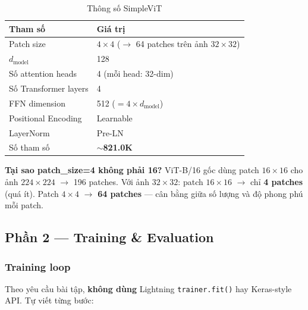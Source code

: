 \documentclass[12pt, a4paper]{article}
\begin{document}
\begin{table}[H]
\centering
\caption{Thông số SimpleViT}
\begin{tabular}{ll}
\toprule
\textbf{Tham số} & \textbf{Giá trị} \\
\midrule
Patch size          & $4\times4$ ($\rightarrow$ 64 patches trên ảnh $32\times32$) \\
$d_\text{model}$    & 128 \\
Số attention heads  & 4 (mỗi head: 32-dim) \\
Số Transformer layers & 4 \\
FFN dimension       & 512 ($= 4 \times d_\text{model}$) \\
Positional Encoding & Learnable \\
LayerNorm           & Pre-LN \\
Số tham số          & $\sim$\textbf{821.0K} \\
\bottomrule
\end{tabular}
\end{table}

\begin{myquote}
\textbf{Tại sao patch\_size=4 không phải 16?} ViT-B/16 gốc dùng patch $16\times16$ cho ảnh $224\times224$ $\rightarrow$ 196 patches. Với ảnh $32\times32$: patch $16\times16$ $\rightarrow$ chỉ \textbf{4 patches} (quá ít). Patch $4\times4$ $\rightarrow$ \textbf{64 patches} --- cân bằng giữa số lượng và độ phong phú mỗi patch.
\end{myquote}

\subsection{Phần 2 --- Training \& Evaluation}

\subsubsection{Training loop}

Theo yêu cầu bài tập, \textbf{không dùng} Lightning \texttt{trainer.fit()} hay Keras-style API. Tự viết từng bước:
\end{document}
